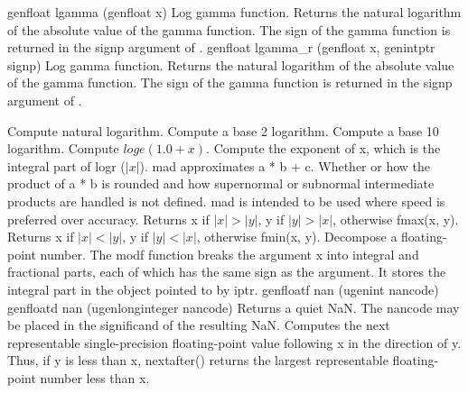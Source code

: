 \addRow
{
  genfloat lgamma (genfloat x)
}
{
  Log gamma function. Returns the natural
logarithm of the absolute value of the gamma
function. The sign of the gamma function is
returned in the signp argument of .
}
\addRow
{
  genfloat lgamma_r (genfloat x, genintptr signp)
}
{
  Log gamma function. Returns the natural
logarithm of the absolute value of the gamma
function. The sign of the gamma function is
returned in the signp argument of .
}


{
 Compute natural logarithm.
 }
{
 Compute a base 2 logarithm.
 }
{
Compute a base 10 logarithm.
}
 {
 Compute $loge(1.0 + x)$.
 }
{
Compute the exponent of x, which is the integral
part of logr ($| x |$).
}
{
mad approximates a * b + c. Whether or how the
product of a * b is rounded and how supernormal or
subnormal intermediate products are handled is not
defined. mad is intended to be used where speed is
preferred over accuracy.
}
{
Returns x if $| x |  >  | y |$, y if $| y | > | x |$, otherwise
fmax(x, y).
}
{
Returns x if $| x | < | y |$, y if $| y | < | x |$, otherwise
fmin(x, y).
}
{
Decompose a floating-point number. The modf
function breaks the argument x into integral and
fractional parts, each of which has the same sign as
the argument. It stores the integral part in the object
pointed to by iptr.
}
\addRowTwoSL
{ genfloatf nan (ugenint nancode)}
{ genfloatd nan (ugenlonginteger nancode)}
{
Returns a quiet NaN. The nancode may be placed
in the significand of the resulting NaN.
}
{
Computes the next representable single-precision
floating-point value following x in the direction of
y. Thus, if y is less than x, nextafter() returns the
largest representable floating-point number less
than x.}

